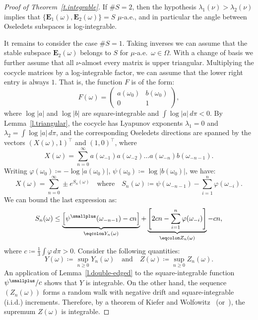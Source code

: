 \documentclass[AHL,Unicode,longabstracts,published]{cedram}
\newcommand{\E}{\mathbf{E}}
\renewcommand{\phi}{\varphi}
\begin{document}
\begin{proof}[Proof of Theorem~\ref{t.integrable}]
If $\# S = 2$, then the hypothesis $\lambda_1(\nu) > \lambda_2(\nu)$ implies that $\{ \E_1(\omega), \E_2(\omega)\} = S$ $\mu$-a.e., and in particular the angle between Oseledets subspaces is log-integrable.

It remains to consider the case $\# S = 1$. Taking inverses we can assume that the stable subspace $\E_2(\omega)$ belongs to $S$ for $\mu$-a.e.~$\omega \in \Omega$. With a change of basis we further assume that all $\nu$-almost every matrix is upper triangular. Multiplying the cocycle matrices by a log-integrable factor, we can assume that the lower right entry is always $1$. That is, the function $F$ is of the form:
\begin{equation}
F(\omega) =
\begin{pmatrix}
a(\omega_0) & b(\omega_0) \\ 0 & 1
\end{pmatrix} ,
\end{equation}
where $\log|a|$ and $\log|b|$ are square-integrable and $\int \log |a| \, d\pi < 0$. By Lemma~\ref{l.triangular}, the cocycle has Lyapunov exponents $\lambda_1 = 0$ and $\lambda_2 = \int \log |a| \, d\pi$, and the corresponding Oseledets directions are spanned by the vectors $(X(\omega),1)^\top$ and $(1,0)^\top$, where
\begin{equation}
X(\omega) = \sum_{n=0}^\infty a(\omega_{-1}) a(\omega_{-2}) \dots a(\omega_{-n}) b(\omega_{-n-1}).
\end{equation}
Writing $\phi(\omega_0) \coloneqq - \log |a(\omega_0)|$, $\psi(\omega_0) \coloneqq \log |b(\omega_0)|$, we have:
\begin{equation}
X(\omega) = \sum_{n=0}^\infty \pm e^{S_n(\omega)} \quad \text{where} \quad S_n(\omega) \coloneqq \psi(\omega_{-n-1}) - \sum_{i=1}^n \phi(\omega_{-i}).
\end{equation}
We can bound the last expression as:
\begin{equation}
S_n(\omega) \le
\underbrace{\Big[\psi^{\smallplus}(\omega_{-n-1}) -cn \Big]}_{\eqcolon Y_n(\omega)} +
\underbrace{\left[2cn - {\sum_{i=1}^n \phi(\omega_{-i}) } \right]}_{\eqcolon Z_n(\omega)} -cn,
\end{equation}
where $c \coloneqq \frac{1}{3} \int \phi \, d\pi > 0$. Consider the following quantities:
\begin{equation}
Y(\omega) \coloneqq \sup_{n \ge 0} Y_n(\omega) \quad \text{and} \quad Z(\omega) \coloneqq \sup_{n \ge 0} Z_n(\omega).
\end{equation}
An application of Lemma~\ref{l.double-edged} to the square-integrable function $\psi^{\smallplus}/c$ shows that $Y$ is integrable. On the other hand, the sequence $(Z_n(\omega))$ forms a random walk with negative drift and square-integrable (i.i.d.) increments. Therefore, by a theorem of Kiefer and Wolfowitz~\cite[Theorem~5]{KieferWolfowitz} (or~\cite[Corollary~3, p.~397]{Chow}), the supremum $Z(\omega)$ is integrable.


\end{proof}
\end{document}
